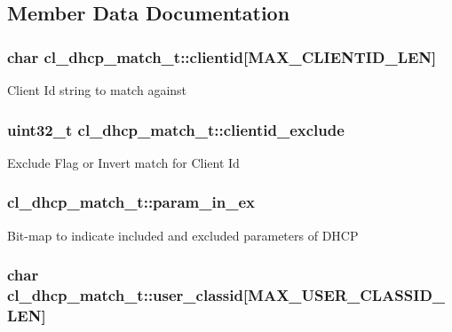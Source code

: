 \subsection{Member Data Documentation}
\hypertarget{structcl__dhcp__match__t_a470963491f6c59a80fd70132406a7085}{
\subsubsection[{clientid}]{\setlength{\rightskip}{0pt plus 5cm}char cl\-\_\-dhcp\-\_\-match\-\_\-t\-::clientid\mbox{[}{\bf M\-A\-X\-\_\-\-C\-L\-I\-E\-N\-T\-I\-D\-\_\-\-L\-E\-N}\mbox{]}}}\label{structcl__dhcp__match__t_a470963491f6c59a80fd70132406a7085}
Client Id string to match against \hypertarget{structcl__dhcp__match__t_a3d01140b8ad2771af007bc6b338f67d9}{
\subsubsection[{clientid\-\_\-exclude}]{\setlength{\rightskip}{0pt plus 5cm}uint32\-\_\-t cl\-\_\-dhcp\-\_\-match\-\_\-t\-::clientid\-\_\-exclude}}\label{structcl__dhcp__match__t_a3d01140b8ad2771af007bc6b338f67d9}
Exclude Flag or Invert match for Client Id \hypertarget{structcl__dhcp__match__t_a1b012eaaabefd67b6a9b251270b48666}{
\subsubsection[{param\-\_\-in\-\_\-ex}]{ cl\-\_\-dhcp\-\_\-match\-\_\-t\-::param\-\_\-in\-\_\-ex}}\label{structcl__dhcp__match__t_a1b012eaaabefd67b6a9b251270b48666}
Bit-\/map to indicate included and excluded parameters of D\-H\-C\-P \hypertarget{structcl__dhcp__match__t_a43948e837781a5411afbf92f86b6ef9d}{
\subsubsection[{user\-\_\-classid}]{\setlength{\rightskip}{0pt plus 5cm}char cl\-\_\-dhcp\-\_\-match\-\_\-t\-::user\-\_\-classid\mbox{[}{\bf M\-A\-X\-\_\-\-U\-S\-E\-R\-\_\-\-C\-L\-A\-S\-S\-I\-D\-\_\-\-L\-E\-N}\mbox{]}}}\label{structcl__dhcp__match__t_a43948e837781a5411afbf92f86b6ef9d}
